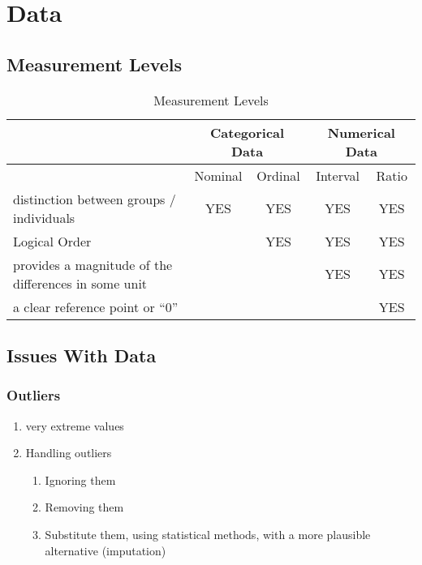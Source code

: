 \chapter{Data}

\section{Measurement Levels \cite{ism-1}}\label{measurement_levels}
\renewcommand{\arraystretch}{1.5}
\begin{table}[h!]
    \centering
    \begin{tabular}{|l|c|c|c|c|}
        \hline
        & \multicolumn{2}{c|}{Categorical Data} & \multicolumn{2}{c|}{Numerical Data} \\ \hline
        & Nominal & Ordinal & Interval & Ratio \\ \hline
        distinction between groups / individuals & YES & YES & YES & YES \\ \hline
        Logical Order & & YES & YES & YES \\ \hline
        provides a magnitude of the differences in some unit & & & YES & YES \\ \hline
        a clear reference point or ``0'' & & & & YES \\ \hline
    \end{tabular}
    \caption{Measurement Levels}
    \label{tab:data_comparison}
\end{table}

\section{Issues With Data}
\subsection{Outliers \cite{ism-1}}\label{outliers}
\begin{enumerate}
    \item very extreme values
    \item Handling outliers
    \begin{enumerate}
        \item Ignoring them
        \item Removing them
        \item Substitute them, using statistical methods, with a more plausible alternative (imputation)
    \end{enumerate}
\end{enumerate}

